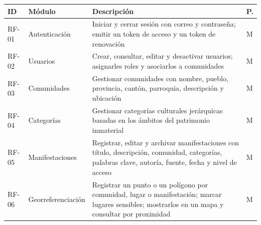 {\centering\singlespacing
  \label{tab:rf_web}
  \begin{tabular}{|p{}|p{}|p{}|p{}|}
    \hline
    \textbf{ID} & \textbf{Módulo} & \textbf{Descripción} & \textbf{P.} \tabularnewline
    \hline
    \raggedright\hspace{0pt}RF-01 & \raggedright\hspace{0pt}Autenticación & \raggedright\hspace{0pt}Iniciar y cerrar sesión con correo y contraseña; emitir un token de acceso y un token de renovación & \raggedright\hspace{0pt}M \tabularnewline
    \hline
    \raggedright\hspace{0pt}RF-02 & \raggedright\hspace{0pt}Usuarios & \raggedright\hspace{0pt}Crear, consultar, editar y desactivar usuarios; asignarles roles y asociarlos a comunidades & \raggedright\hspace{0pt}M \tabularnewline
    \hline
    \raggedright\hspace{0pt}RF-03 & \raggedright\hspace{0pt}Comunidades & \raggedright\hspace{0pt}Gestionar comunidades con nombre, pueblo, provincia, cantón, parroquia, descripción y ubicación & \raggedright\hspace{0pt}M \tabularnewline
    \hline
    \raggedright\hspace{0pt}RF-04 & \raggedright\hspace{0pt}Categorías & \raggedright\hspace{0pt}Gestionar categorías culturales jerárquicas basadas en los ámbitos del patrimonio inmaterial & \raggedright\hspace{0pt}M \tabularnewline
    \hline
    \raggedright\hspace{0pt}RF-05 & \raggedright\hspace{0pt}Manifestaciones & \raggedright\hspace{0pt}Registrar, editar y archivar manifestaciones con título, descripción, comunidad, categorías, palabras clave, autoría, fuente, fecha y nivel de acceso & \raggedright\hspace{0pt}M \tabularnewline
    \hline
    \raggedright\hspace{0pt}RF-06 & \raggedright\hspace{0pt}Georreferenciación & \raggedright\hspace{0pt}Registrar un punto o un polígono por comunidad, lugar o manifestación; marcar lugares sensibles; mostrarlos en un mapa y consultar por proximidad & \raggedright\hspace{0pt}M \tabularnewline

\end{tabular}}
